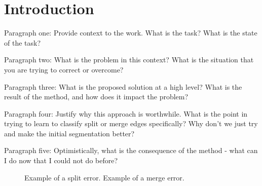 \section{Introduction}

Paragraph one: Provide context to the work.
What is the task? What is the state of the task?

Paragraph two: What is the problem in this context? What is the situation that you are trying to correct or overcome?

Paragraph three: What is the proposed solution at a high level? What is the result of the method, and how does it impact the problem?

Paragraph four: Justify why this approach is worthwhile. What is the point in trying to learn to classify split or merge edges specifically? Why don't we just try and make the initial segmentation better?

Paragraph five: Optimistically, what is the consequence of the method - what can I do now that I could not do before?

\begin{figure}
\caption{Example of a split error. Example of a merge error.}
\end{figure}